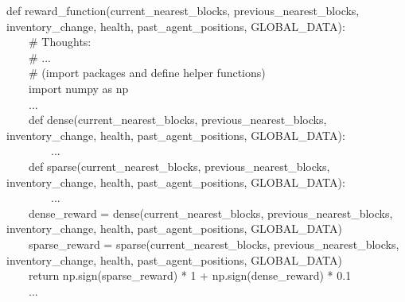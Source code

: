 def reward\_function(current\_nearest\_blocks, previous\_nearest\_blocks, inventory\_change, health, past\_agent\_positions, GLOBAL\_DATA):
\\
\hbox{\ \ \ \ }\# Thoughts:\\
\hbox{\ \ \ \ }\# ...\\
\hbox{\ \ \ \ }\# (import packages and define helper functions)\\
\hbox{\ \ \ \ }import numpy as np\\
\hbox{\ \ \ \ }...\\
\hbox{\ \ \ \ }def dense(current\_nearest\_blocks, previous\_nearest\_blocks, inventory\_change, health, past\_agent\_positions, GLOBAL\_DATA):\\
\hbox{\ \ \ \ \ \ \ \ }...\\
\hbox{\ \ \ \ }def sparse(current\_nearest\_blocks, previous\_nearest\_blocks, inventory\_change, health, past\_agent\_positions, GLOBAL\_DATA):\\
\hbox{\ \ \ \ \ \ \ \ }...\\
\hbox{\ \ \ \ }dense\_reward = dense(current\_nearest\_blocks, previous\_nearest\_blocks, inventory\_change, health, past\_agent\_positions, GLOBAL\_DATA)\\
\hbox{\ \ \ \ }sparse\_reward = sparse(current\_nearest\_blocks, previous\_nearest\_blocks, inventory\_change, health, past\_agent\_positions, GLOBAL\_DATA)\\
\hbox{\ \ \ \ }return np.sign(sparse\_reward) * 1 + np.sign(dense\_reward) * 0.1\\
\hbox{\ \ \ \ }...\\
